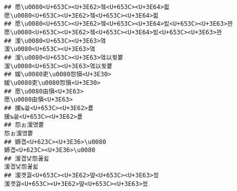 \documentclass[]{article}
\begin{document}
\begin{verbatim}
## 愿\u0080<U+653C><U+3E62>젴<U+653C><U+3E64>븳                                                                                                                                                             愿\u0080<U+653C><U+3E62>젴<U+653C><U+3E64>븳
## 愿\u0080<U+653C><U+3E62>젴<U+653C><U+3E64>빐<U+653C><U+3E63>꽌                                                                                                                                     愿\u0080<U+653C><U+3E62>젴<U+653C><U+3E64>빐<U+653C><U+3E63>꽌
## 湲\u0080<U+653C><U+3E63>옄                                                                                                                                                                                     湲\u0080<U+653C><U+3E63>옄
## 湲\u0080<U+653C><U+3E63>옄以묒뿉                                                                                                                                                                         湲\u0080<U+653C><U+3E63>옄以묒뿉
## 媛\u0080吏\u0080怨愼<U+3E30>                                                                                                                                                                           媛\u0080吏\u0080怨愼<U+3E30>
## 愿\u0080由愼<U+3E63>                                                                                                                                                                                           愿\u0080由愼<U+3E63>
## 援ъ쓽<U+653C><U+3E62>룞                                                                                                                                                                                         援ъ쓽<U+653C><U+3E62>룞
## 怨ぉ湲몄뿉                                                                                                                                                                                                         怨ぉ湲몄뿉
## 嫄곕<U+623C><U+3E36>\u0080                                                                                                                                                                                     嫄곕<U+623C><U+3E36>\u0080
## 湲곕낯怨꾪쉷                                                                                                                                                                                                     湲곕낯怨꾪쉷
## 湲곗궗<U+653C><U+3E62>떂<U+653C><U+3E63>씠                                                                                                                                                                 湲곗궗<U+653C><U+3E62>떂<U+653C><U+3E63>씠

\end{verbatim}
\end{document}
